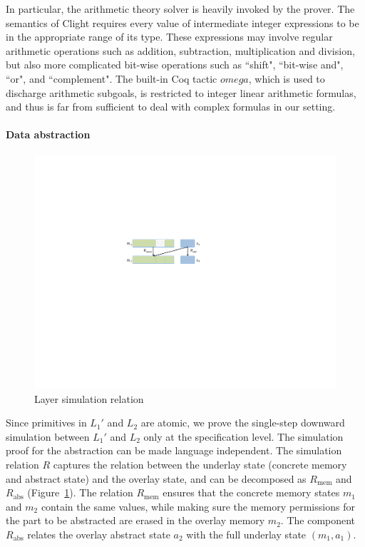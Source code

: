 In particular, the arithmetic theory solver is heavily invoked by the
prover. The semantics of Clight requires every value of intermediate
integer expressions to be in the appropriate range of its type. These
expressions may involve regular arithmetic operations such as
addition, subtraction, multiplication and division, but also more
complicated bit-wise operations such as ``shift", ``bit-wise and", ``or", and
``complement". The built-in Coq tactic $omega$, which is used to
discharge arithmetic subgoals, is restricted to integer linear
arithmetic formulas, and thus is far from sufficient to deal with
complex formulas in our setting.


\paragraph{Data abstraction}
\begin{figure}[t]\centering
\includegraphics[scale=1]{figs/layersimulation}
\caption{Layer simulation relation}
\label{fig:layersimulation}
\hrulefill
    \afterpage{\FloatBarrier}
\end{figure}
Since primitives in $L_1'$ and $L_2$ are atomic, we prove the
single-step downward simulation between $L_1'$ and $L_2$ only at the
specification level.  The simulation proof for the abstraction can be
made language independent.  The simulation relation $R$ captures the
relation between the underlay state (concrete memory and abstract
state) and the overlay state, and can be decomposed as $R_\text{mem}$
and $R_\text{abs}$ (\cf Figure~\ref{fig:layersimulation}). The relation
$R_\text{mem}$ ensures that the concrete memory states $m_1$ and $m_2$
contain the same values, while making sure the memory permissions for
the part to be abstracted are erased in the overlay memory $m_2$.  The
component $R_\text{abs}$ relates the overlay abstract state $a_2$ with
the full underlay state $(m_1, a_1)$.

